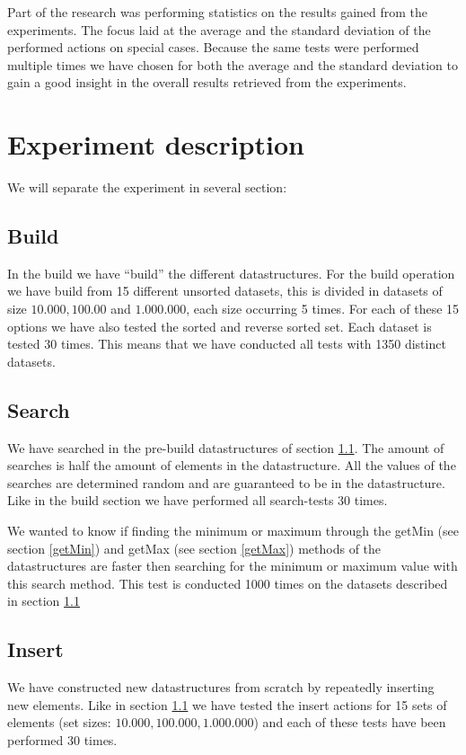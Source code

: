 \documentclass{article}
\begin{document}
Part of the research was performing statistics on the results gained from the experiments. The focus laid at the average and the standard deviation of the performed actions on special cases. Because the same tests were performed multiple times we have chosen for both the average and the standard deviation to gain a good insight in the overall results retrieved from the experiments. 

\section{Experiment description}
We will separate the experiment in several section:
\subsection{Build}
\label{Build}
In the build we have ``build'' the different datastructures. 
For the build operation we have build from 15 different unsorted datasets, this is divided in datasets of size $10.000, 100.00$ and $1.000.000$, each size occurring 5 times.  For each of these 15 options we have also tested the sorted and reverse sorted set. Each dataset is tested 30 times. This means that we have conducted all tests with 1350 distinct datasets.
\subsection{Search}
We have searched in the pre-build datastructures of section \ref{Build}. The amount of searches is half the amount of elements in the datastructure. All the values of the searches are determined random and are guaranteed to be in the datastructure. Like in the build section we have performed all search-tests 30 times. 

We wanted to know if finding the minimum or maximum through the getMin (see section \ref{getMin}) and getMax (see section \ref{getMax}) methods of the datastructures are faster then searching for the minimum or maximum value with this search method. This test is conducted 1000 times on the datasets described in section \ref{Build}
\subsection{Insert}
We have constructed new datastructures from scratch by repeatedly inserting new elements. Like in section \ref{Build} we have tested the insert actions for 15 sets of elements (set sizes: $10.000, 100.000, 1.000.000$) and each of these tests have been performed 30 times.
\end{document}

